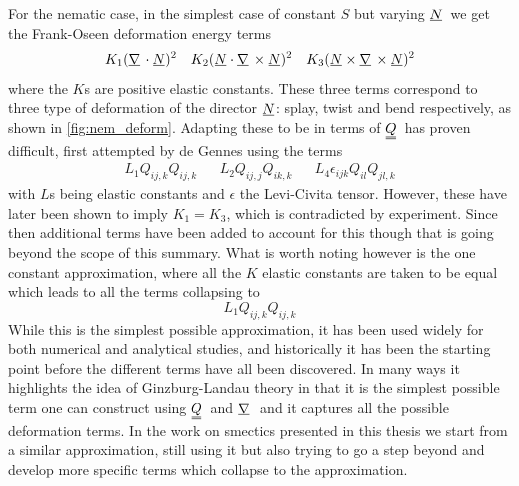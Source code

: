 \documentclass[12pt]{article}
\newcommand{\suf}[2]{\stackunder[0.5pt]{\stackunder[1pt]{\ensuremath{#1}}{\rule{\widthof{\ensuremath{#2}}*\real{0.9}}{.1ex}}}{}}
\newcommand{\duf}[2]{\stackunder[0.5pt]{\stackunder[0.8pt]{\stackunder[1pt]{\ensuremath{#1}}{\rule{\widthof{\ensuremath{#2}}*\real{0.9}}{.1ex}}}{\rule{\widthof{\ensuremath{#2}}*\real{0.9}}{.1ex}}}{}}
\newcommand{\su}[1]{\suf{#1}{#1}}
\newcommand{\du}[1]{\duf{#1}{#1}}
\newcommand{\mgrad}{\ensuremath{\suf{\nabla}{K}\,}}
\newcommand{\QQ}{\ensuremath{\du{Q}}}
\newcommand{\NN}{\ensuremath{\su{N}}}
\begin{document}
        For the nematic case, in the simplest case of constant $S$ but varying \NN\ we get the Frank-Oseen deformation energy terms\cite{brayTheoryPhaseOrdering1993,frankLiquidCrystalsTheory1958,gennesPhysicsLiquidCrystals1995}
        \begin{align}
            K_1 (\mgrad \cdot \su{N})^2 && K_2 (\su{N} \cdot \mgrad \times \su{N})^2 && K_3 (\su{N} \times \mgrad \times \su{N})^2
        \end{align}
        where the $K$s are positive elastic constants.
        These three terms correspond to three type of deformation of the director \NN: splay, twist and bend respectively, as shown in \cref{fig:nem_deform}.
        Adapting these to be in terms of \QQ\ has proven difficult, first attempted by de Gennes\cite{gennesPhysicsLiquidCrystals1995} using the terms
        \begin{align}
            L_1Q_{ij,k}Q_{ij,k} && L_2Q_{ij,j}Q_{ik,k} && L_4\epsilon_{ijk}Q_{il}Q_{jl,k}
        \end{align}
        with $L$s being elastic constants and $\epsilon$ the Levi-Civita tensor.
        However, these have later been shown to imply $K_1 = K_3$\cite{lubenskyMolecularDescriptionNematic1970}, which is contradicted by experiment.
        Since then additional terms have been added to account for this\cite{longaExtensionLandauGinzburgdeGennes1987} though that is going beyond the scope of this summary.
        What is worth noting however is the one constant approximation, where all the $K$ elastic constants are taken to be equal which leads to all the terms collapsing to
        \begin{equation}
            L_1 Q_{ij,k}Q_{ij,k}
        \end{equation}
        While this is the simplest possible approximation, it has been used widely for both numerical and analytical studies, and historically it has been the starting point before the different terms have all been discovered.
        In many ways it highlights the idea of Ginzburg-Landau theory in that it is the simplest possible term one can construct using \QQ\ and \mgrad\ and it captures all the possible deformation terms.
        In the work on smectics presented in this thesis we start from a similar approximation, still using it but also trying to go a step beyond and develop more specific terms which collapse to the approximation.
\end{document}
